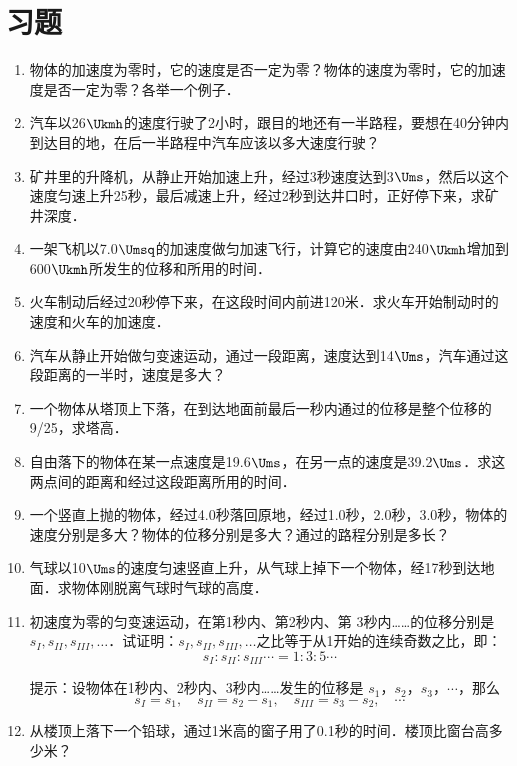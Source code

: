 \section*{习题}
\begin{enumerate}
	\item 物体的加速度为零时，它的速度是否一定为零？物体的速度为零时，它的加速度是否一定为零？各举一个例子．
	\item 汽车以26$\Ukmh$的速度行驶了2小时，跟目的地还有一半路程，要想在40分钟内到达目的地，在后一半路程中汽车应该以多大速度行驶？
	\item 矿井里的升降机，从静止开始加速上升，经过3秒速度达到3$\Ums$，然后以这个速度匀速上升25秒，最后减速上升，经过2秒到达井口时，正好停下来，求矿井深度．
	\item 一架飞机以7.0$\Umsq$的加速度做匀加速飞行，计算它的速度由240$\Ukmh$增加到600$\Ukmh$所发生的位移和所用的时间．
	\item 火车制动后经过20秒停下来，在这段时间内前进120米．求火车开始制动时的速度和火车的加速度．
	\item 汽车从静止开始做匀变速运动，通过一段距离，速度达到14$\Ums$，汽车通过这段距离的一半时，速度是多大？
	\item 一个物体从塔顶上下落，在到达地面前最后一秒内通过的位移是整个位移的9/25，求塔高．
	\item 自由落下的物体在某一点速度是19.6$\Ums$，在另一点的速度是39.2$\Ums$．求这两点间的距离和经过这段距离所用的时间．
	\item 一个竖直上抛的物体，经过4.0秒落回原地，经过1.0秒，2.0秒，3.0秒，物体的速度分别是多大？物体的位移分别是多大？通过的路程分别是多长？
	\item 气球以10$\Ums$的速度匀速竖直上升，从气球上掉下一个物体，经17秒到达地面．求物体刚脱离气球时气球的高度．
	\item 初速度为零的匀变速运动，在第1秒内、第2秒内、第
	3秒内……的位移分别是$s_I,s_{II},s_{III},\ldots$．试证明：$s_I,s_{II},s_{III},\ldots$之比等于从1开始的连续奇数之比，即：
$$s_I:s_{II}:s_{III}\cdots=1:3:5\cdots$$

提示：设物体在1秒内、2秒内、3秒内……发生的位移是
$s_1 $，$ s_2 $，$ s_3 $，$ \cdots$，那么
$$s_I=s_1,   \quad  s_{II}=s_2-s_1,   \quad s_{III}=s_3-s_2,  \quad \cdots$$
	\item 从楼顶上落下一个铅球，通过1米高的窗子用了0.1秒的时间．楼顶比窗台高多少米？
\end{enumerate}





